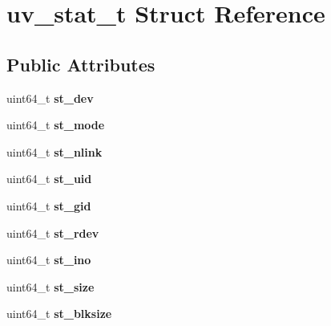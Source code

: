 \hypertarget{structuv__stat__t}{}\section{uv\+\_\+stat\+\_\+t Struct Reference}
\label{structuv__stat__t}
\subsection*{Public Attributes}
\begin{DoxyCompactItemize}
\item 
\mbox{\label{structuv__stat__t_ac1f0764990fe34d0b21f7e3af9fef946}} 
uint64\+\_\+t {\bfseries st\+\_\+dev}
\item 
\mbox{\label{structuv__stat__t_a198c4352c514e9eff06e7363c3562a8f}} 
uint64\+\_\+t {\bfseries st\+\_\+mode}
\item 
\mbox{\label{structuv__stat__t_a05b9207a1a204eae78b2c7dc0d3812ab}} 
uint64\+\_\+t {\bfseries st\+\_\+nlink}
\item 
\mbox{\label{structuv__stat__t_ac56d6239041749e7bc4ccc472aa800b1}} 
uint64\+\_\+t {\bfseries st\+\_\+uid}
\item 
\mbox{\label{structuv__stat__t_aa6d1907b84accf5662140cb0834e479d}} 
uint64\+\_\+t {\bfseries st\+\_\+gid}
\item 
\mbox{\label{structuv__stat__t_af0cc8e07491b42cd8b82d797ec5af0b4}} 
uint64\+\_\+t {\bfseries st\+\_\+rdev}
\item 
\mbox{\label{structuv__stat__t_a1442738c45923c0a23f7ee0c2837f584}} 
uint64\+\_\+t {\bfseries st\+\_\+ino}
\item 
\mbox{\label{structuv__stat__t_a454ac6f7cef9a00d73baf2028fe3a7cb}} 
uint64\+\_\+t {\bfseries st\+\_\+size}
\item 
\mbox{\label{structuv__stat__t_af549bc8ae4793b83fa25b97fc5518e67}} 
uint64\+\_\+t {\bfseries st\+\_\+blksize}
\item 
\mbox{\label{structuv__stat__t_a7cb4ce091e3b7418f368451dd60e535e}} 

\end{DoxyCompactItemize}
